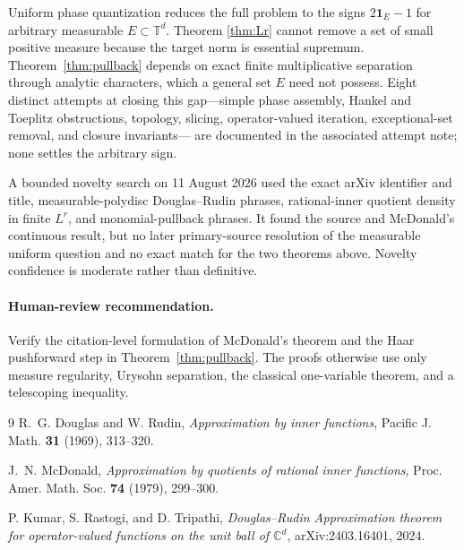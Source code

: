 \documentclass[11pt]{article}
\newcommand{\T}{\mathbb T}
\begin{document}
Uniform phase quantization reduces the full problem to the signs
$2\mathbf1_E-1$ for arbitrary measurable $E\subset\T^d$.  Theorem
\ref{thm:Lr} cannot remove a set of small positive measure because the target
norm is essential supremum.  Theorem~\ref{thm:pullback} depends on exact finite
multiplicative separation through analytic characters, which a general set
$E$ need not possess.  Eight distinct attempts at closing this gap---simple
phase assembly, Hankel and Toeplitz obstructions, topology, slicing,
operator-valued iteration, exceptional-set removal, and closure invariants---
are documented in the associated attempt note; none settles the arbitrary
sign.

A bounded novelty search on 11 August 2026 used the exact arXiv identifier and
title, measurable-polydisc Douglas--Rudin phrases, rational-inner quotient
density in finite $L^r$, and monomial-pullback phrases.  It found the source
and McDonald's continuous result, but no later primary-source resolution of
the measurable uniform question and no exact match for the two theorems above.
Novelty confidence is moderate rather than definitive.

\paragraph{Human-review recommendation.}
Verify the citation-level formulation of McDonald's theorem and the Haar
pushforward step in Theorem~\ref{thm:pullback}.  The proofs otherwise use only
measure regularity, Urysohn separation, the classical one-variable theorem,
and a telescoping inequality.

\begin{thebibliography}{9}
R.~G. Douglas and W. Rudin,
\emph{Approximation by inner functions},
Pacific J. Math. \textbf{31} (1969), 313--320.

J.~N. McDonald,
\emph{Approximation by quotients of rational inner functions},
Proc. Amer. Math. Soc. \textbf{74} (1979), 299--300.

P. Kumar, S. Rastogi, and D. Tripathi,
\emph{Douglas--Rudin Approximation theorem for operator-valued functions on
the unit ball of $\mathbb C^d$}, arXiv:2403.16401, 2024.
\end{thebibliography}
\end{document}
